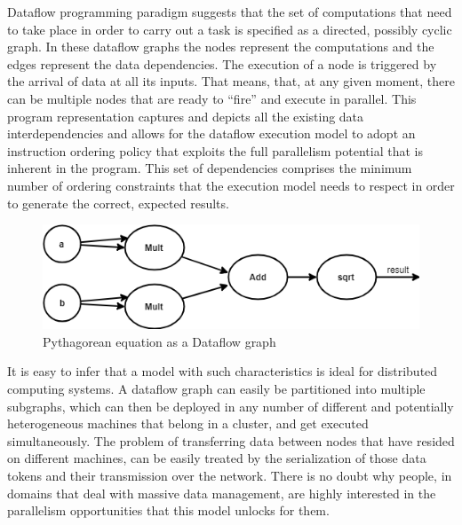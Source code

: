 \documentclass[ack,preface]{dithesis}
\begin{document}
Dataflow programming paradigm suggests that the set of computations that need to take place in order to carry out a task is specified as a directed, possibly cyclic graph. In these dataflow graphs the nodes represent the computations and the edges represent the data dependencies. The execution of a node is triggered by the arrival of data at all its inputs. That means, that, at any given moment, there can be multiple nodes that are ready to “fire” and execute in parallel. This program representation captures and depicts all the existing data interdependencies and allows for the dataflow execution model to adopt an instruction ordering policy that exploits the full parallelism potential that is inherent in the program. This set of dependencies comprises the minimum number of ordering constraints that the execution model needs to respect in order to generate the correct, expected results.

\begin{figure}
\centering
\includegraphics[scale=0.8]{figures/dataflowExample}
\caption{ Pythagorean equation as a Dataflow graph}
\end{figure}

It is easy to infer that a model with such characteristics is ideal for distributed computing systems. A dataflow graph can easily be partitioned into multiple subgraphs, which can then be deployed in any number of different and potentially heterogeneous machines that belong in a cluster, and get executed simultaneously. The problem of transferring data between nodes that have resided on different machines, can be easily treated by the serialization of those data tokens and their transmission over the network.
There is no doubt why people, in domains that deal with massive data management, are highly interested in the parallelism opportunities that this model unlocks for them. \\
\linebreak\linebreak\linebreak\linebreak\linebreak\linebreak
\end{document}
